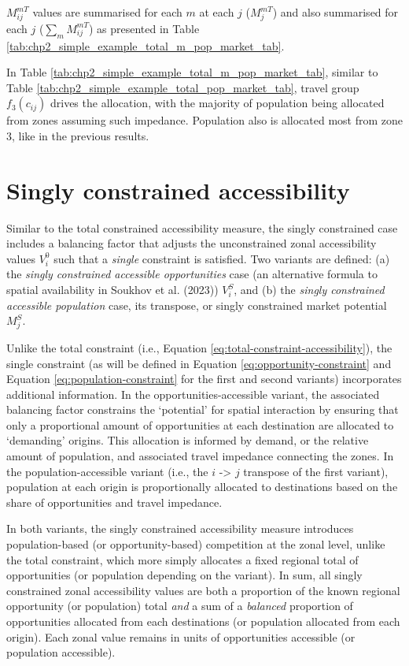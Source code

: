 \documentclass[
11pt, %
oneside, %
english, %
singlespacing, %
]{macthesis} %
\begin{document}
\(M^{mT}_{ij}\) values are summarised for each \(m\) at each \(j\) (\(M^{mT}_{j}\)) and also summarised for each \(j\) (\(\sum_m M^{mT}_{ij}\)) as presented in Table \ref{tab:chp2_simple_example_total_m_pop_market_tab}.



In Table \ref{tab:chp2_simple_example_total_m_pop_market_tab}, similar to Table \ref{tab:chp2_simple_example_total_pop_market_tab}, travel group \(f_3(c_{ij})\) drives the allocation, with the majority of population being allocated from zones assuming such impedance. Population also is allocated most from zone 3, like in the previous results.

\section{Singly constrained accessibility}\label{singly-constrained-accessibility}

Similar to the total constrained accessibility measure, the singly constrained case includes a balancing factor that adjusts the unconstrained zonal accessibility values \(V^0_i\) such that a \emph{single} constraint is satisfied. Two variants are defined: (a) the \emph{singly constrained accessible opportunities} case (an alternative formula to spatial availability in Soukhov et al. (2023)) \(V_{i}^{S}\), and (b) the \emph{singly constrained accessible population} case, its transpose, or singly constrained market potential \(M_{j}^{S}\).

Unlike the total constraint (i.e., Equation \ref{eq:total-constraint-accessibility}), the single constraint (as will be defined in Equation \ref{eq:opportunity-constraint} and Equation \ref{eq:population-constraint} for the first and second variants) incorporates additional information. In the opportunities-accessible variant, the associated balancing factor constrains the `potential' for spatial interaction by ensuring that only a proportional amount of opportunities at each destination are allocated to `demanding' origins. This allocation is informed by demand, or the relative amount of population, and associated travel impedance connecting the zones. In the population-accessible variant (i.e., the \(i\) -\textgreater{} \(j\) transpose of the first variant), population at each origin is proportionally allocated to destinations based on the share of opportunities and travel impedance.

In both variants, the singly constrained accessibility measure introduces population-based (or opportunity-based) competition at the zonal level, unlike the total constraint, which more simply allocates a fixed regional total of opportunities (or population depending on the variant). In sum, all singly constrained zonal accessibility values are both a proportion of the known regional opportunity (or population) total \emph{and} a sum of a \emph{balanced} proportion of opportunities allocated from each destinations (or population allocated from each origin). Each zonal value remains in units of opportunities accessible (or population accessible).
\end{document}
